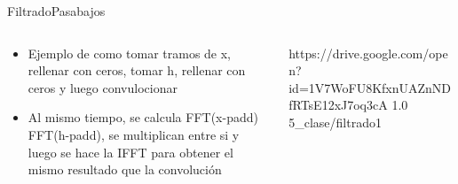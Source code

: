 \begin{frame}[t]{Filtrado}{Pasabajos}
   \begin{columns}[t]
      \begin{column}{.4\textwidth}
         \begin{itemize}
            \item{Ejemplo de como tomar tramos de x, rellenar con ceros, tomar h, rellenar con ceros y luego convulocionar}
            \item{Al mismo tiempo, se calcula FFT(x-padd) FFT(h-padd), se multiplican entre si y luego se hace la IFFT para obtener el mismo resultado que la convolución}
         \end{itemize}
      \end{column}
      \hspace{2pt}
      \vrule
      \hspace{2pt}
      \begin{column}{.6\textwidth}
         {https://drive.google.com/open?id=1V7WoFU8KfxnUAZnNDfRTsE12xJ7oq3cA}
         {1.0}
         {5_clase/filtrado1}
      \end{column}
      \hspace{2pt}
   \end{columns}
   \vfill
\end{frame}

